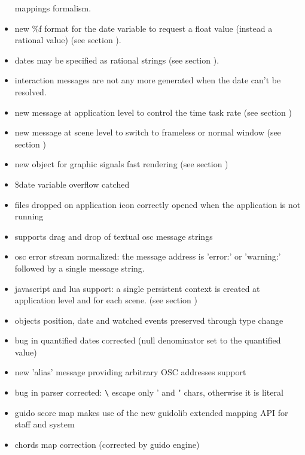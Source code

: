 \begin{itemize}
  mappings formalism.
\item new \%f format for the date variable to request a float value (instead a rational value) (see section ).
\item dates may be specified as rational strings (see section ).
\item interaction messages are not any more generated when the date can't be resolved.
\item new  message at application level to control the time task rate (see section )
\item new  message at scene level to switch to frameless or normal window (see section )
\end{itemize}

\begin{itemize}
\item new  object for graphic signals fast rendering (see section )
\item \$date variable overflow catched
\item files dropped on application icon correctly opened when the application is not running
\item supports drag and drop of textual osc message strings
\item osc error stream normalized: the message address is 'error:' or 'warning:'
   followed by a single message string.
\item javascript and lua support: a single persistent context is created at application level and for each scene. 
(see section )
\end{itemize}

\begin{itemize}
\item  objects position, date and watched events preserved through type change
\item  bug in quantified dates corrected (null denominator set to the quantified value)
\item  new 'alias' message providing arbitrary OSC addresses support
\item  bug in parser corrected: \verb+\+ escape only ' and " chars, otherwise it is literal
\item  guido score map makes use of the new guidolib extended mapping API for staff and system
\item  chords map correction (corrected by guido engine) 
\end{itemize}

